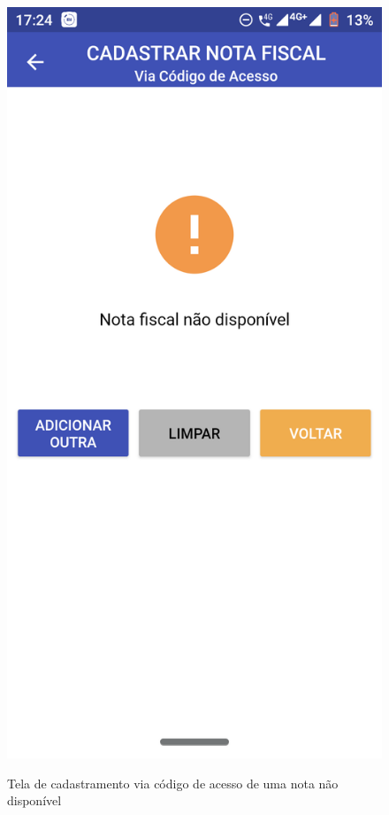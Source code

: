 \newpage
\begin{figure}[h]
    \centering
    \caption{Tela de cadastramento via código de acesso de uma nota não disponível}
    \includegraphics[scale=0.15]{tcc/figures/app/app_codigo_acesso_nao_disponivel.png}
    \label{appCodigoAcessoNaoDisponivelFig}
\end{figure}


